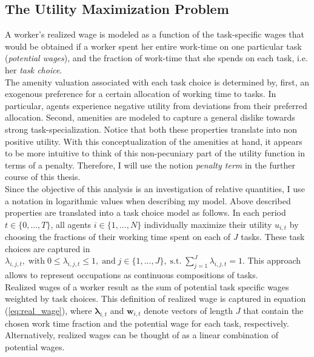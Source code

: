 \documentclass[../main.tex]{subfiles}
\begin{document}
\subsection{The Utility Maximization Problem} \label{sec:utility-max-problem}
A worker's realized wage is modeled as a function of the task-specific wages that would be obtained if a worker spent her entire work-time on one particular task (\textit{potential wages}), and the fraction of work-time that she spends on each task, i.e. her \textit{task choice}.
\\
The amenity valuation associated with each task choice is determined by, first, an exogenous preference for a certain allocation of working time to tasks. In particular, agents experience negative utility from deviations from their preferred allocation. Second, amenities are modeled to capture a general dislike towards strong task-specialization. Notice that both these properties translate into non positive utility. With this conceptualization of the amenities at hand, it appears to be more intuitive to think of this non-pecuniary part of the utility function in terms of a penalty. Therefore, I will use the notion \textit{penalty term} in the further course of this thesis. 
\\
Since the objective of this analysis is an investigation of relative quantities, I use a notation in logarithmic values when describing my model. Above described properties are translated into a task choice model as follows. In each period $t \in \{0, ..., T\}$, all agents $i \in \{1, ..., N\}$ individually maximize their utility $u_{i,t}$ by choosing the fractions of their working time spent on each of $J$ tasks. These task choices are captured in $\lambda_{i,j,t}, \; \text{with} \; 0 \leq \lambda_{i,j,t} \leq 1, \; \text{and} \;j \in \{1, ..., J\}, \; \text{s.t.} \; \sum^J_{j=1} \lambda_{i,j,t} = 1$. This approach allows to represent occupations as continuous compositions of tasks.
\\ 
Realized wages of a worker result as the sum of potential task specific wages weighted by task choices. This definition of realized wage is captured in equation (\ref{eq:real_wage}), where $\boldsymbol{\lambda}_{i,t}$ and $\boldsymbol{w}_{i,t}$ denote vectors of length $J$ that contain the chosen work time fraction and the potential wage for each task, respectively. Alternatively, realized wages can be thought of as a linear combination of potential wages.
\end{document}

